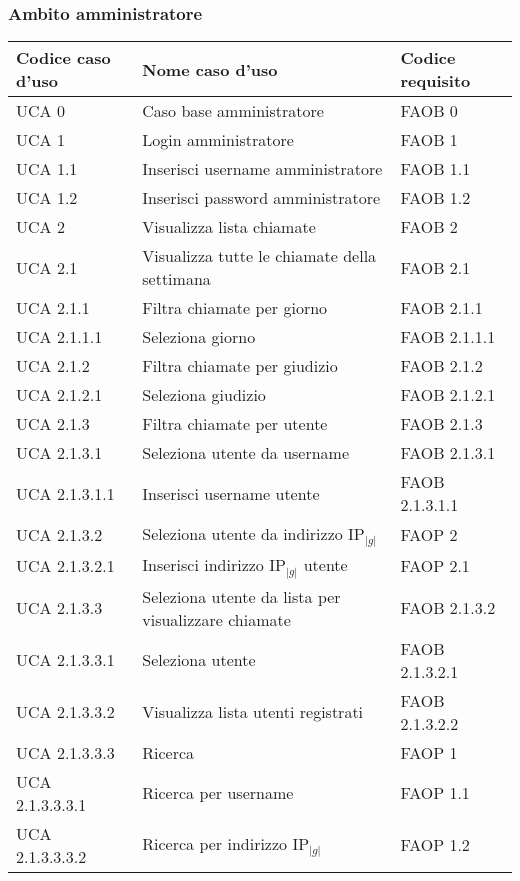 \subsubsection{Ambito amministratore}
\begin{longtable}{p{} p{} p{} }
\rowcolors{2}{light}{}
\textbf{Codice \newline caso d'uso} & \textbf{Nome caso d'uso} & \textbf{Codice requisito} \\
\midrule
\midrule
UCA 0 & Caso base amministratore & FAOB 0\\

\midrule
UCA 1 & Login amministratore & FAOB 1\\

\midrule
UCA 1.1 & Inserisci username amministratore & FAOB 1.1\\
\midrule
UCA 1.2 & Inserisci password amministratore & FAOB 1.2\\

\midrule
UCA 2 & Visualizza lista chiamate & FAOB 2\\

\midrule
UCA 2.1 & Visualizza tutte le chiamate della settimana & FAOB 2.1\\

\midrule
UCA 2.1.1 & Filtra chiamate per giorno & FAOB 2.1.1\\
\midrule
UCA 2.1.1.1 & Seleziona giorno & FAOB 2.1.1.1\\

\midrule
UCA 2.1.2 & Filtra chiamate per giudizio & FAOB 2.1.2\\
\midrule
UCA 2.1.2.1 & Seleziona giudizio & FAOB 2.1.2.1\\

\midrule
UCA 2.1.3 & Filtra chiamate per utente & FAOB 2.1.3\\
\midrule
UCA 2.1.3.1 & Seleziona utente da username & FAOB 2.1.3.1\\
\midrule
UCA 2.1.3.1.1 & Inserisci username utente & FAOB 2.1.3.1.1\\
\midrule
UCA 2.1.3.2 & Seleziona utente da indirizzo IP$_{|g|}$ & FAOP 2\\
\midrule
UCA 2.1.3.2.1 & Inserisci indirizzo IP$_{|g|}$ utente & FAOP 2.1\\
\midrule
UCA 2.1.3.3 & Seleziona utente da lista per \newline visualizzare chiamate & FAOB 2.1.3.2\\
\midrule
UCA 2.1.3.3.1 & Seleziona utente & FAOB 2.1.3.2.1\\
\midrule
UCA 2.1.3.3.2 & Visualizza lista utenti registrati & FAOB 2.1.3.2.2\\
\midrule
UCA 2.1.3.3.3 & Ricerca & FAOP 1\\
\midrule
UCA 2.1.3.3.3.1 & Ricerca per username & FAOP 1.1\\
\midrule
UCA 2.1.3.3.3.2 & Ricerca per indirizzo IP$_{|g|}$ & FAOP 1.2\\



\end{longtable}
